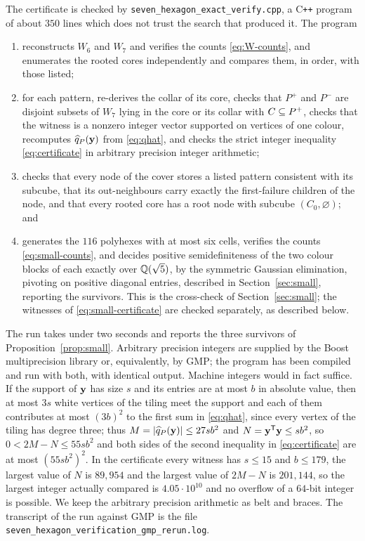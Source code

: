 \documentclass[11pt]{article}
\newcommand\tp{^{\mathsf T}}
\newcommand\abs[1]{\lvert #1\rvert}
\theoremstyle{definition}
\begin{document}
The certificate is checked by
\texttt{seven\_\allowbreak hexagon\_\allowbreak exact\_\allowbreak verify.cpp},
a C\texttt{++} program of about $350$ lines which does not trust the search
that produced it.  The program
\begin{enumerate}
\item[(i)] reconstructs $W_6$ and $W_7$ and verifies the counts
 \eqref{eq:W-counts}, and enumerates the rooted cores independently and
 compares them, in order, with those listed;
\item[(ii)] for each pattern, re-derives the collar of its core, checks
 that $P^{+}$ and $P^{-}$ are disjoint subsets of $W_7$ lying in the core or
 its collar with $C\subseteq P^{+}$, checks that the witness is a nonzero integer
 vector supported on vertices of one colour, recomputes
 $\widehat q_P({\mathbf y})$ from \eqref{eq:qhat}, and checks the strict integer
 inequality \eqref{eq:certificate} in arbitrary precision integer
 arithmetic;
\item[(iii)] checks that every node of the cover stores a listed pattern
 consistent with its subcube, that its out-neighbours carry exactly the
 first-failure children of the node, and that every rooted core has a root
 node with subcube $(C_0,\varnothing)$; and
\item[(iv)] generates the $116$ polyhexes with at most six cells, verifies
 the counts \eqref{eq:small-counts}, and decides positive semidefiniteness
 of the two colour blocks of each exactly over ${\mathbb Q}(\sqrt5)$, by the
 symmetric Gaussian elimination, pivoting on positive diagonal entries,
 described in Section~\ref{sec:small}, reporting the survivors.  This is the
 cross-check of Section~\ref{sec:small}; the witnesses of
 \eqref{eq:small-certificate} are checked separately, as described below.
\end{enumerate}
The run takes under two seconds and reports the three survivors of
Proposition~\ref{prop:small}.  Arbitrary precision integers are supplied by
the Boost multiprecision library or, equivalently, by GMP; the program has
been compiled and run with both, with identical output.  Machine integers
would in fact suffice.  If the support of ${\mathbf y}$ has size $s$ and its entries
are at most $b$ in absolute value, then at most $3s$ white vertices of the
tiling meet the support and each of them contributes at most $(3b)^{2}$ to
the first sum in \eqref{eq:qhat}, since every vertex of the tiling has degree
three; thus $M=\abs{\widehat q_P(\Zy)}\le27sb^{2}$ and $N=\Zy\tp\Zy\le sb^{2}$,
so $0<2M-N\le55sb^{2}$ and both sides of the second inequality in
\eqref{eq:certificate} are at most $(55sb^{2})^{2}$.  In the certificate
every witness has $s\le15$ and $b\le179$, the largest value of $N$ is
$89{,}954$ and the largest value of $2M-N$ is $201{,}144$, so the largest
integer actually compared is $4.05\cdot10^{10}$ and no overflow of a $64$-bit
integer is possible.  We keep the arbitrary precision arithmetic as belt and
braces.  The transcript of the run against GMP is the file
\texttt{seven\_hexagon\_verification\_gmp\_rerun.log}.
\end{document}
